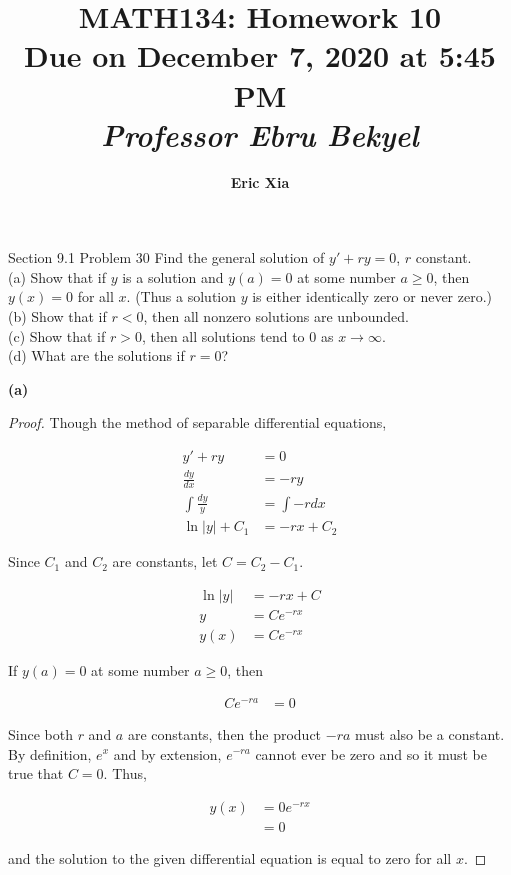 \documentclass{article}
\title{
    \vspace{2in}
    \textmd{\textbf{MATH134: Homework 10}}\\
    \normalsize\vspace{0.1in}\small{Due on December 7, 2020 at 5:45 PM}\\
    \vspace{0.1in}\large{\textit{Professor Ebru Bekyel}}
    \vspace{3in}
}
\author{\textbf{Eric Xia}}
\date{}
\begin{document}
    \maketitle
    \pagebreak

    \thispagestyle{2}


    \begin{tbhtheorem}{Section 9.1 Problem 30}
        Find the general solution of $y' + ry = 0$, $r$ constant. \\
        (a) Show that if $y$ is a solution and $y(a) = 0$ at some number $a\geq 0$, then $y(x) = 0$ for all $x$. (Thus a solution $y$ is either identically zero or never zero.) \\
        (b) Show that if $r < 0$, then all nonzero solutions are unbounded. \\
        (c) Show that if $r > 0$, then all solutions tend to 0 as $x\rightarrow \infty$. \\
        (d) What are the solutions if $r=0$?
    \end{tbhtheorem}

    \textbf{(a)}
    \begin{proof}
        Though the method of separable differential equations,

        \begin{align*}
            y' + ry &= 0 \\
            \frac{dy}{dx}       &= -ry \\
            \int \frac{dy}{y}   &= \int -r dx \\
            \ln{|y|}+C_1        &= -rx + C_2
        \end{align*}

        Since $C_1$ and $C_2$ are constants, let $C=C_2 - C_1$.

        \begin{align*}
            \ln{|y|}            &= -rx + C \\
            y                   &= Ce^{-rx} \\
            y(x)                &= Ce^{-rx}
        \end{align*}

        If $y(a)=0$ at some number $a\geq 0$, then

        \begin{align*}
            Ce^{-ra}    &= 0
        \end{align*}

        Since both $r$ and $a$ are constants, then the product $-ra$ must also be a constant. By definition, $e^{x}$ and by extension, $e^{-ra}$ cannot ever be zero and so it must be true that $C=0$. Thus,

        \begin{align*}
            y(x) &= 0e^{-rx} \\
                 &= 0
        \end{align*}

        and the solution to the given differential equation is equal to zero for all $x$.
    \end{proof}
\end{document}

